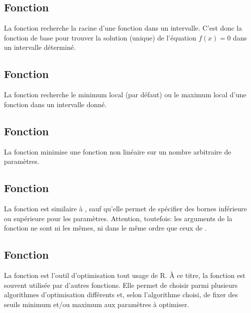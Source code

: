 \subsection{Fonction }
\label{optimisation:fonctions:uniroot}

La fonction  recherche la racine d'une fonction dans un intervalle.
C'est donc la fonction de base pour trouver la solution (unique) de
l'équation $f(x) = 0$ dans un intervalle déterminé.


\subsection{Fonction }
\label{optimisation:fonctions:optimize}

La fonction  recherche le
minimum local (par
défaut) ou le maximum local d'une fonction dans un intervalle donné.


\subsection{Fonction }
\label{optimisation:fonctions:nlm}

La fonction  minimise une fonction non
linéaire
sur un nombre arbitraire de paramètres.


\subsection{Fonction }
\label{optimisation:fonctions:nlminb}

La fonction  est similaire à , sauf
qu'elle permet de spécifier des bornes inférieure ou supérieure
pour les paramètres. Attention, toutefois: les arguments de la
fonction ne sont ni les mêmes, ni dans le même ordre que ceux de
.


\subsection{Fonction }
\label{optimisation:fonctions:optim}

La fonction  est l'outil
d'optimisation tout usage de R. À ce titre, la fonction est souvent
utilisée par d'autres fonctions. Elle permet de choisir parmi
plusieurs algorithmes d'optimisation différents et, selon l'algorithme
choisi, de fixer des seuils minimum et/ou maximum aux paramètres à
optimiser.


